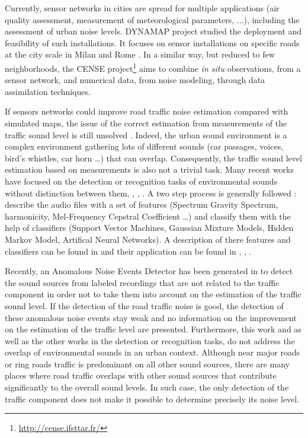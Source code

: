 \documentclass[twocolumn,a4paper,10pt]{article}
\begin{document}
Currently, sensor networks in cities are spread for multiple applications (air quality assessment, measurement of meteorological parameters, ...), including the assessment of urban noise levels. DYNAMAP project \cite{dynamap_2016} studied the deployment and feasibility of such installations. It focuses on sensor installations on specific roads at the city scale in Milan and Rome \cite{bellucci_life_2017}. In a similar way, but reduced to few neighborhoods, the CENSE project\footnote{\url{http://cense.ifsttar.fr/}} \cite{picaut2017characterization} aims to combine \textit{in situ} observations, from a sensor network, and numerical data, from noise modeling, through data assimilation techniques.

If sensors networks could improve road traffic noise estimation compared with simulated maps, the issue of the correct estimation from  measurements of the traffic sound level is still unsolved \cite{Mioduszewski}. Indeed, the urban sound environment is a complex environment gathering lots of different sounds (car passages, voices, bird's whistles, car horn \dots) that can overlap. Consequently, the traffic sound level estimation based on measurements is also not a trivial task.
Many recent works have focused on the detection or recognition tasks of environmental sounds without distinction between them\cite{heittola_sound_2011}, \cite{defreville_automatic_2006}, \cite{dufaux_automatic_2000}, \cite{chu_environmental_2009}. A two step process is generally followed : describe the audio files with a set of features (Spectrum Gravity Spectrum, harmonicity, Mel-Frequency Cepstral Coefficient \dots) and classify them with the help of classifiers (Support Vector Machines, Gaussian Mixture Models, Hidden Markov Model, Artifical Neural Networks). A description of there features and classifiers can be found in \cite{cowling_comparison_2003} and their application can be found in \cite{shen_environmental_2012}, \cite{beritelli_pattern_2008}, \cite{couvreur_automatic_2004}.

Recently, an Anomalous Noise Events Detector has been generated in \cite{socoro_anomalous_2017} to detect the sound sources from labeled recordings that are not related to the traffic component in order not to take them into account on the estimation of the traffic sound level. If the detection of the road traffic noise is good, the detection of these anomalous noise events stay weak and no information on the improvement on the estimation of the traffic  level are presented. Furthermore, this work and as well as the other works in the detection or recognition tasks, do not address the overlap of environmental sounds in an urban context. Although near major roads or ring roads traffic is predominant on all other sound sources, there are many places where road traffic overlaps with other sound sources that contribute significantly to the overall sound levels. In such case, the only detection of the traffic component does not make it possible to determine precisely its noise level.
\end{document}
